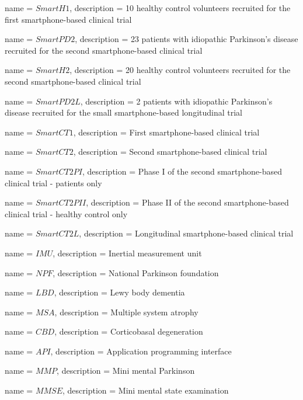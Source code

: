 {
	name = $SmartH1$, 
	description = 10 healthy control volunteers recruited for the first smartphone-based clinical trial
}

{
	name = $SmartPD2$, 
	description = 23 patients with idiopathic Parkinson's disease recruited for the second smartphone-based clinical trial
}

{
	name = $SmartH2$, 
	description = 20 healthy control volunteers recruited for the second smartphone-based clinical trial
}

{
	name = $SmartPD2L$, 
	description = 2 patients with idiopathic Parkinson's disease recruited for the small smartphone-based longitudinal trial
}

{
	name = $SmartCT1$, 
	description = First smartphone-based clinical trial
}

{
	name = $SmartCT2$, 
	description = Second smartphone-based clinical trial
}

{
	name = $SmartCT2PI$, 
	description = Phase I of the second smartphone-based clinical trial - patients only
}

{
	name = $SmartCT2PII$, 
	description = Phase II of the second smartphone-based clinical trial - healthy control only
}

{
	name = $SmartCT2L$, 
	description = Longitudinal smartphone-based clinical trial
}

{
	name = $IMU$, 
	description = Inertial measurement unit
}

{
	name = $NPF$, 
	description = National Parkinson foundation
}

{
	name = $LBD$, 
	description = Lewy body dementia
}

{
	name = $MSA$, 
	description = Multiple system atrophy
}

{
	name = $CBD$, 
	description = Corticobasal degeneration
}

{
	name = $API$, 
	description = Application programming interface
}

{
	name = $MMP$, 
	description = Mini mental Parkinson
}

{
	name = $MMSE$, 
	description = Mini mental state examination
}

